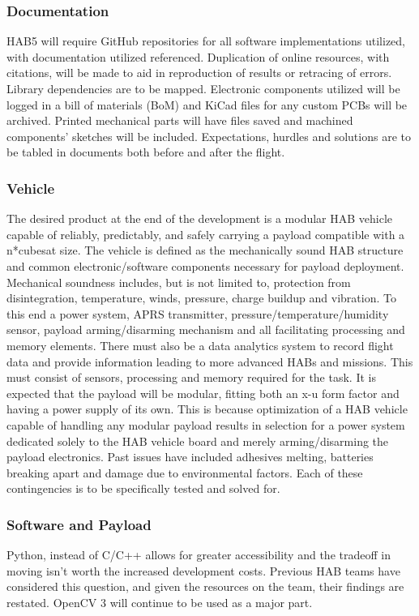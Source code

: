 \documentclass[conference]{IEEEtran} %
\begin{document}
\subsubsection{Documentation}
\label{deliverables-documentation}
 HAB5 will require GitHub repositories for all software implementations utilized, with documentation utilized referenced. Duplication of online resources, with citations, will be made to aid in reproduction of results or retracing of errors. 
 Library dependencies are to be mapped. 
 Electronic components utilized will be logged in a bill of materials (BoM) and KiCad files for any custom PCBs will be archived. 
 Printed mechanical parts will have files saved and machined components' sketches will be included. 
 Expectations, hurdles and solutions are to be tabled in documents both before and after the flight.

\subsubsection{Vehicle}
\label{deliverables-vehicle}
The desired product at the end of the development is a modular HAB vehicle capable of reliably, predictably, and safely carrying a payload compatible with a n*cubesat size. 
The vehicle is defined as the mechanically sound HAB structure and common electronic/software components necessary for payload deployment. 
Mechanical soundness includes, but is not limited to, protection from disintegration, temperature, winds, pressure, charge buildup and vibration. 
To this end a power system, APRS transmitter, pressure/temperature/humidity sensor, payload arming/disarming mechanism and all facilitating processing and memory elements. 
There must also be a data analytics system to record flight data and provide information leading to more advanced HABs and missions. 
This must consist of sensors, processing and memory required for the task.
It is expected that the payload will be modular, fitting both an x-u form factor and having a power supply of its own. 
This is because optimization of a HAB vehicle capable of handling any modular payload results in selection for a power system dedicated solely to the HAB vehicle board and merely arming/disarming the payload electronics. 
Past issues have included adhesives melting, batteries breaking apart and damage due to environmental factors. Each of these contingencies is to be specifically tested and solved for.

\subsubsection{Software and Payload}
\label{deliverables-payload}
Python, instead of C/C++ allows for greater accessibility and the tradeoff in moving isn't worth the increased development costs. 
Previous HAB teams have considered this question, and given the resources on the team, their findings are restated. OpenCV 3 will continue to be used as a major part.
\end{document}
